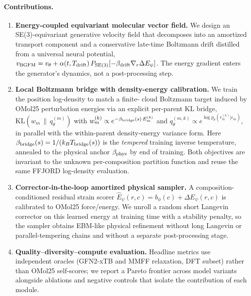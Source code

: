 \documentclass{article}
\begin{document}
\paragraph{Contributions.}
\begin{enumerate}
    \item \textbf{Energy-coupled equivariant molecular vector field.}
    We design an SE(3)-equivariant generative velocity field that
    decomposes into an amortized transport component and a
    conservative late-time Boltzmann drift distilled from a universal
    neural potential,
    $v_{\rm BGFM} = v_\theta + \alpha(t,T_{\rm drift})\,P_{\rm SE(3)}[-\beta_{\rm drift}\nabla_r \Delta E_\psi]$.
    The energy gradient enters the generator's dynamics, not a
    post-processing step.
    \item \textbf{Local Boltzmann bridge with density-energy
    calibration.} We train the position log-density to match a finite-
    cloud Boltzmann target induced by OMol25 perturbation energies via
    an explicit per-parent KL bridge,
    $\mathrm{KL}(w_m\,\|\,q^{(m)}_\theta)$ with
    $w_m^{(k)}\propto e^{-\beta_{\rm bridge}(s)\, E_m^{(k)}}$ and
    $q^{(m,k)}_\theta\propto e^{\log p_\theta(r_m^{(k)}|c_m)}$, in
    parallel with the within-parent density-energy variance form. Here
    $\beta_{\rm bridge}(s) = 1/(k_B T_{\rm bridge}(s))$ is the
    \emph{tempered} training inverse temperature, annealed to the
    physical anchor $\beta_{\rm phys}$ by end of training. Both
    objectives are invariant to the unknown per-composition partition
    function and reuse the same FFJORD log-density evaluation.
    \item \textbf{Corrector-in-the-loop amortized physical sampler.}
    A composition-conditioned residual strain scorer
    $\hat E_\psi(r,c) = b_\phi(c) + \Delta E_\psi(r,c)$ is calibrated to
    OMol25 force/energy. We unroll a random short Langevin corrector
    on this learned energy at training time with a stability penalty,
    so the sampler obtains EBM-like physical refinement without long
    Langevin or parallel-tempering chains and without a separate
    post-processing stage.
    \item \textbf{Quality--diversity--compute evaluation.}
    Headline metrics use independent oracles (GFN2-xTB and MMFF
    relaxation, DFT subset) rather than OMol25 self-scores; we report
    a Pareto frontier across model variants alongside ablations and
    negative controls that isolate the contribution of each module.
\end{enumerate}
\end{document}
